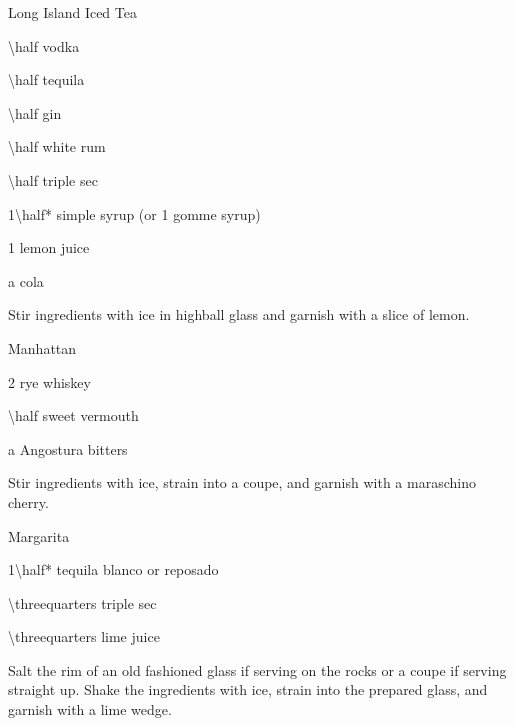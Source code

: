 \begin{Cocktail}{Long Island Iced Tea}
  \begin{Ingredients}\normalsize
  \item \SI{\half}{\oz} vodka
  \item \SI{\half}{\oz} tequila
  \item \SI{\half}{\oz} gin
  \item \SI{\half}{\oz} white rum
  \item \SI{\half}{\oz} triple sec
  \item \SI{1\half*}{\oz} simple syrup (or \SI{1}{\oz} gomme syrup)
  \item \SI{1}{\oz} lemon juice
  \item a \si{\splash} cola
  \end{Ingredients}
  
  \begin{Instructions}\small
	Stir ingredients with ice in highball glass and garnish with a slice of lemon.
  \end{Instructions}
\end{Cocktail}

\begin{Cocktail}{Manhattan}
  \begin{Ingredients}
  \item \SI{2}{\oz} rye whiskey
  \item \SI{\half}{\oz} sweet vermouth
  \item a \si{\dash} Angostura bitters
  \end{Ingredients}
  
  \begin{Instructions}
	Stir ingredients with ice, strain into a coupe, and garnish with a maraschino cherry. 
  \end{Instructions}
\end{Cocktail}

\begin{Cocktail}{Margarita}
  \begin{Ingredients}
  \item \SI{1\half*}{\oz} tequila blanco or reposado
  \item \SI{\threequarters}{\oz} triple sec
  \item \SI{\threequarters}{\oz} lime juice
  \end{Ingredients}
  
  \begin{Instructions}
	Salt the rim of an old fashioned glass if serving on the rocks or a coupe if serving straight up.  Shake the ingredients with ice, strain into the prepared glass, and garnish with a lime wedge.
  \end{Instructions}
\end{Cocktail}

